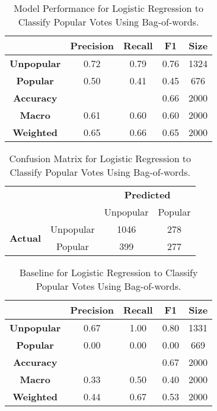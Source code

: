\documentclass[11pt,a4paper]{article}
\begin{document}
\begin{table}[h!]
\centering
 \begin{tabular}{|c c c c c|} 
 \hline
 & {\bf Precision} & {\bf Recall} & {\bf F1} & {\bf Size} \\ [0.5ex] 
 \hline\hline
  {\bf Unpopular } & 0.72 & 0.79 & 0.76 & 1324\\ 
  {\bf Popular } & 0.50 & 0.41 & 0.45 & 676 \\
  {\bf Accuracy } & & & 0.66 & 2000 \\
  {\bf Macro } & 0.61 & 0.60 & 0.60 & 2000 \\
  {\bf Weighted } & 0.65 & 0.66 & 0.65 & 2000\\ [1ex] 
 \hline
 \end{tabular}
  \caption{\label{tab:Table 2}Model Performance for Logistic Regression to Classify Popular Votes Using Bag-of-words.}
\end{table}

\begin{table}[h!]
\begin{tabular}{cc|cc}
\multicolumn{2}{c}{}
    & \multicolumn{2}{c}{\bf Predicted} \\
    & & Unpopular & Popular \\ 
    \cline{2-4}
\multirow{2}{*}{{\bf Actual}}
    & Unpopular   & 1046 & 278 \\
    & Popular    & 399 & 277  \\ 
    \cline{2-4}
\end{tabular}
  \caption{\label{tab:Table 3}Confusion Matrix for Logistic Regression to Classify Popular Votes Using Bag-of-words.}
\end{table}

\begin{table}[h!]
\centering
 \begin{tabular}{|c c c c c|} 
 \hline
 & {\bf Precision} & {\bf Recall} & {\bf F1} & {\bf Size} \\ [0.5ex] 
 \hline\hline
 {\bf Unpopular } & 0.67 & 1.00 & 0.80 & 1331\\ 
 {\bf Popular } & 0.00 & 0.00 & 0.00 & 669 \\
 {\bf Accuracy } & & & 0.67 & 2000 \\
 {\bf Macro } & 0.33 & 0.50 & 0.40 & 2000 \\
 {\bf Weighted } & 0.44 & 0.67 & 0.53 & 2000\\ [1ex] 
 \hline
 \end{tabular}
   \caption{\label{tab:Table 4}Baseline for Logistic Regression to Classify Popular Votes Using Bag-of-words.}
\end{table}
\end{document}
